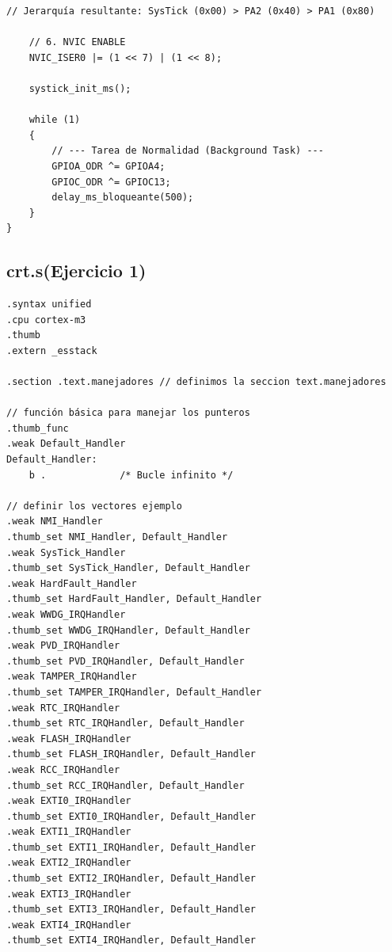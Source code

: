 \begin{lstlisting}[caption={Configuración inicial en main.c}, label={cod:main}]
    // Jerarquía resultante: SysTick (0x00) > PA2 (0x40) > PA1 (0x80)

    // 6. NVIC ENABLE
    NVIC_ISER0 |= (1 << 7) | (1 << 8); 

    systick_init_ms();

    while (1)
    {
        // --- Tarea de Normalidad (Background Task) ---
        GPIOA_ODR ^= GPIOA4; 
        GPIOC_ODR ^= GPIOC13;
        delay_ms_bloqueante(500); 
    }
}
\end{lstlisting}
\subsection{crt.s(Ejercicio 1)}
\begin{lstlisting}[language=ARMasm]
.syntax unified 
.cpu cortex-m3
.thumb
.extern _esstack

.section .text.manejadores // definimos la seccion text.manejadores 

// función básica para manejar los punteros 
.thumb_func 
.weak Default_Handler
Default_Handler:
    b .             /* Bucle infinito */

// definir los vectores ejemplo
.weak NMI_Handler
.thumb_set NMI_Handler, Default_Handler
.weak SysTick_Handler
.thumb_set SysTick_Handler, Default_Handler
.weak HardFault_Handler
.thumb_set HardFault_Handler, Default_Handler
.weak WWDG_IRQHandler
.thumb_set WWDG_IRQHandler, Default_Handler
.weak PVD_IRQHandler
.thumb_set PVD_IRQHandler, Default_Handler
.weak TAMPER_IRQHandler
.thumb_set TAMPER_IRQHandler, Default_Handler
.weak RTC_IRQHandler
.thumb_set RTC_IRQHandler, Default_Handler
.weak FLASH_IRQHandler
.thumb_set FLASH_IRQHandler, Default_Handler
.weak RCC_IRQHandler
.thumb_set RCC_IRQHandler, Default_Handler
.weak EXTI0_IRQHandler
.thumb_set EXTI0_IRQHandler, Default_Handler
.weak EXTI1_IRQHandler
.thumb_set EXTI1_IRQHandler, Default_Handler
.weak EXTI2_IRQHandler
.thumb_set EXTI2_IRQHandler, Default_Handler
.weak EXTI3_IRQHandler
.thumb_set EXTI3_IRQHandler, Default_Handler
.weak EXTI4_IRQHandler
.thumb_set EXTI4_IRQHandler, Default_Handler


\end{lstlisting}
